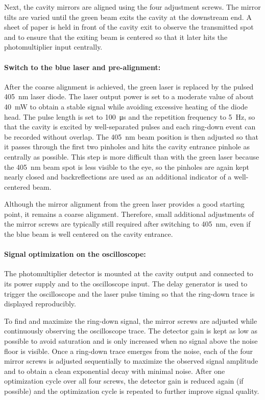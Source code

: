 \documentclass[a4paper]{article}
\begin{document}
Next, the cavity mirrors are aligned using the four adjustment screws.
The mirror tilts are varied until the green beam exits the cavity at the downstream end.
A sheet of paper is held in front of the cavity exit to observe the transmitted spot and to ensure that the exiting beam is centered so that it later hits the photomultiplier input centrally.

\paragraph{Switch to the blue laser and pre-alignment:}
After the coarse alignment is achieved, the green laser is replaced by the pulsed \SI{405}{nm} laser diode.
The laser output power is set to a moderate value of about \SI{40}{mW} to obtain a stable signal while avoiding excessive heating of the diode head.
The pulse length is set to \SI{100}{\micro\second} and the repetition frequency to \SI{5}{Hz}, so that the cavity is excited by well-separated pulses and each ring-down event can be recorded without overlap.
The \SI{405}{nm} beam position is then adjusted so that it passes through the first two pinholes and hits the cavity entrance pinhole as centrally as possible.
This step is more difficult than with the green laser because the \SI{405}{nm} beam spot is less visible to the eye, so the pinholes are again kept nearly closed and backreflections are used as an additional indicator of a well-centered beam.

Although the mirror alignment from the green laser provides a good starting point, it remains a coarse alignment.
Therefore, small additional adjustments of the mirror screws are typically still required after switching to \SI{405}{nm}, even if the blue beam is well centered on the cavity entrance.

\paragraph{Signal optimization on the oscilloscope:}
The photomultiplier detector is mounted at the cavity output and connected to its power supply and to the oscilloscope input.
The delay generator is used to trigger the oscilloscope and the laser pulse timing so that the ring-down trace is displayed reproducibly.

To find and maximize the ring-down signal, the mirror screws are adjusted while continuously observing the oscilloscope trace.
The detector gain is kept as low as possible to avoid saturation and is only increased when no signal above the noise floor is visible.
Once a ring-down trace emerges from the noise, each of the four mirror screws is adjusted sequentially to maximize the observed signal amplitude and to obtain a clean exponential decay with minimal noise.
After one optimization cycle over all four screws, the detector gain is reduced again (if possible) and the optimization cycle is repeated to further improve signal quality.
\end{document}
